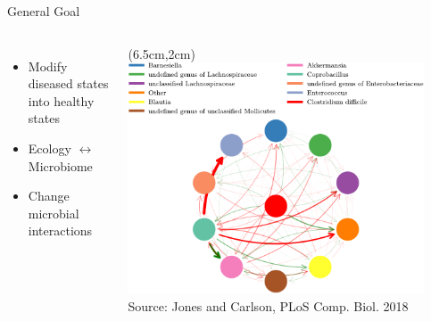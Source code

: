 \documentclass[15pt]{beamer}
\begin{document}
\begin{frame}{General Goal}
\begin{columns}
\begin{itemize}
	\item Modify diseased states into healthy states
	\item Ecology $\leftrightarrow$ Microbiome
	\item Change microbial interactions
\end{itemize}
 
	\begin{textblock*}{6.8cm}(6.5cm,2cm) %
	 \includegraphics[width=0.9\textwidth]{food_web_w_legend_preplos}\\[-1ex]
	 {\tiny Source: Jones and Carlson, PLoS Comp. Biol. 2018}
	\end{textblock*}
\end{columns}
\end{frame}
\end{document}
